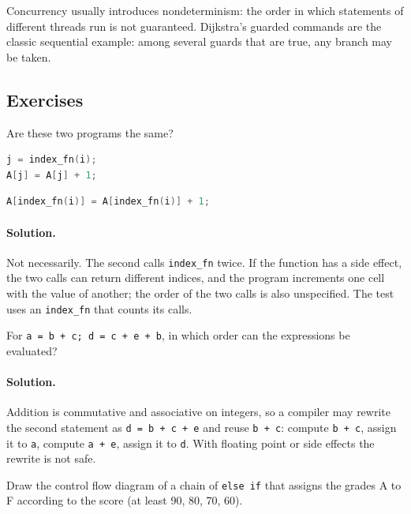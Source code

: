 Concurrency usually introduces nondeterminism: the order in which statements
of different threads run is not guaranteed. Dijkstra's guarded commands are
the classic sequential example: among several guards that are true, any
branch may be taken.

\subsection{Exercises}

\begin{exercise}
Are these two programs the same?
\begin{lstlisting}[language=C]
j = index_fn(i);
A[j] = A[j] + 1;
\end{lstlisting}
\begin{lstlisting}[language=C]
A[index_fn(i)] = A[index_fn(i)] + 1;
\end{lstlisting}
\end{exercise}

\paragraph{Solution.} Not necessarily. The second calls \texttt{index\_fn} twice.
If the function has a side effect, the two calls can return different indices,
and the program increments one cell with the value of another; the order of
the two calls is also unspecified.
The test uses an \texttt{index\_fn} that counts its calls.

\begin{exercise}
For \texttt{a = b + c; d = c + e + b}, in which order can the expressions be
evaluated?
\end{exercise}

\paragraph{Solution.} Addition is commutative and associative on integers, so a
compiler may rewrite the second statement as \texttt{d = b + c + e} and reuse
\texttt{b + c}: compute \texttt{b + c}, assign it to \texttt{a}, compute
\texttt{a + e}, assign it to \texttt{d}. With floating point or side effects
the rewrite is not safe.

\begin{exercise}
Draw the control flow diagram of a chain of \texttt{else if} that assigns the
grades A to F according to the score (at least 90, 80, 70, 60).
\end{exercise}

